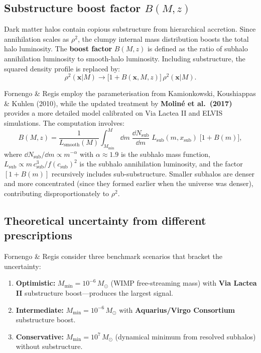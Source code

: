 \documentclass[10pt,a4paper]{article}
\newcommand{\vect}[1]{\mathbf{#1}}
\newcommand{\Msun}{M_\odot}
\begin{document}
\subsection{Substructure boost factor $B(M, z)$}

Dark matter halos contain copious substructure from hierarchical accretion. Since annihilation scales as $\rho^2$, the clumpy internal mass distribution boosts the total halo luminosity. The \textbf{boost factor} $B(M, z)$ is defined as the ratio of subhalo annihilation luminosity to smooth-halo luminosity. Including substructure, the squared density profile is replaced by:
\begin{equation}
\rho^2(\vect{x} | M) \longrightarrow \big[1 + B(\vect{x}, M, z)\big] \, \rho^2(\vect{x} | M).
\end{equation}

Fornengo \& Regis employ the parameterisation from Kamionkowski, Koushiappas \& Kuhlen (2010), while the updated treatment by \textbf{Molin\'{e} et al.\ (2017)} provides a more detailed model calibrated on Via Lactea II and ELVIS simulations. The computation involves:
\begin{equation}
\label{eq:boost}
B(M, z) = \frac{1}{L_{\mathrm{smooth}}(M)} \int_{M_{\mathrm{min}}}^{M} \dd m \; \frac{\dd N_{\mathrm{sub}}}{\dd m} \; L_{\mathrm{sub}}(m, x_{\mathrm{sub}}) \; \big[1 + B(m)\big],
\end{equation}
where $\dd N_{\mathrm{sub}}/\dd m \propto m^{-\alpha}$ with $\alpha \approx 1.9$ is the subhalo mass function, $L_{\mathrm{sub}} \propto m \, c_{\mathrm{sub}}^3/f(c_{\mathrm{sub}})^2$ is the subhalo annihilation luminosity, and the factor $[1 + B(m)]$ recursively includes sub-substructure. Smaller subhalos are denser and more concentrated (since they formed earlier when the universe was denser), contributing disproportionately to $\rho^2$.

\subsection{Theoretical uncertainty from different prescriptions}

Fornengo \& Regis consider three benchmark scenarios that bracket the uncertainty:

\begin{enumerate}[nosep]
    \item \textbf{Optimistic:} $M_{\mathrm{min}} = 10^{-6} \, \Msun$ (WIMP free-streaming mass) with \textbf{Via Lactea II} substructure boost---produces the largest signal.
    \item \textbf{Intermediate:} $M_{\mathrm{min}} = 10^{-6} \, \Msun$ with \textbf{Aquarius/Virgo Consortium} substructure boost.
    \item \textbf{Conservative:} $M_{\mathrm{min}} = 10^7 \, \Msun$ (dynamical minimum from resolved subhalos) without substructure.
\end{enumerate}
\end{document}
